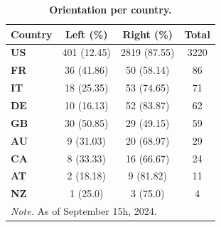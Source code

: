 \begin{table}[H]
\caption{\textbf{Orientation per country.}}
\label{tab:orientation_countries}
\begin{tabularx}{\textwidth}{X c c c}
\toprule
Country & Left (\%) & Right (\%) & Total \\
\midrule
\textbf{US} & 401 (12.45) & 2819 (87.55) & 3220 \\
\textbf{FR} & 36 (41.86) & 50 (58.14) & 86 \\
\textbf{IT} & 18 (25.35) & 53 (74.65) & 71 \\
\textbf{DE} & 10 (16.13) & 52 (83.87) & 62 \\
\textbf{GB} & 30 (50.85) & 29 (49.15) & 59 \\
\textbf{AU} & 9 (31.03) & 20 (68.97) & 29 \\
\textbf{CA} & 8 (33.33) & 16 (66.67) & 24 \\
\textbf{AT} & 2 (18.18) & 9 (81.82) & 11 \\
\textbf{NZ} & 1 (25.0) & 3 (75.0) & 4 \\
\bottomrule
\multicolumn{4}{l}{\textit{Note.} As of September 15h, 2024.}
\end{tabularx}
\end{table}


